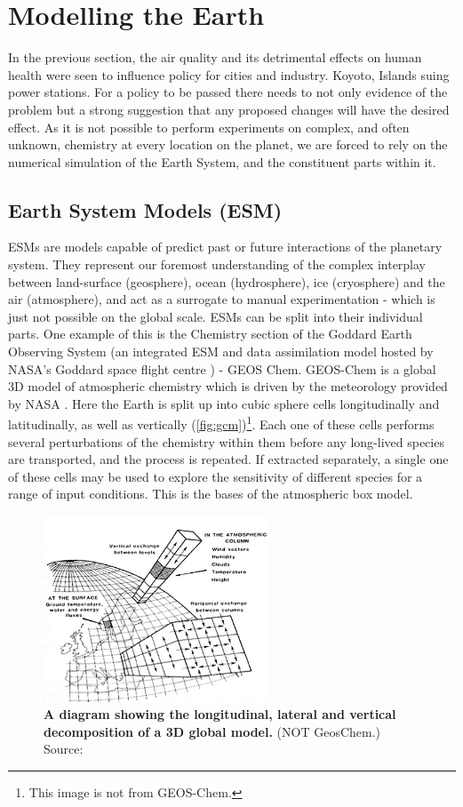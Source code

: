 
\section{Modelling the Earth}
In the previous section, the air quality and its detrimental effects on human health were seen to influence policy for cities and industry. Koyoto, Islands suing power stations.
For a policy to be passed there needs to not only evidence of the problem but a strong suggestion that any proposed changes will have the desired effect. As it is not possible to perform experiments on complex, and often unknown, chemistry at every location on the planet, we are forced to rely on the numerical simulation of the Earth System, and the constituent parts within it.
\subsection{Earth System Models (ESM)}
  ESMs are models capable of predict past or future interactions of the planetary system. They represent our foremost understanding of the complex interplay between land-surface (geosphere), ocean (hydrosphere), ice (cryosphere) and the air (atmosphere), and act as a surrogate to manual experimentation -  which is just not possible on the global scale.
ESMs can be split into their individual parts. One example of this is the Chemistry section of the Goddard Earth Observing System (an integrated ESM and data assimilation model hosted by NASA's Goddard space flight centre \citep{geosgit}) - GEOS Chem. GEOS-Chem is a global 3D model of atmospheric chemistry which is driven by the meteorology provided by NASA \citep{geos}. Here the Earth is split up into cubic sphere cells longitudinally and latitudinally, as well as vertically (\autoref{fig:gcm})\footnote{This image is not from GEOS-Chem.}. Each one of these cells performs several perturbations of the chemistry within them before any long-lived species are transported, and the process is repeated. If extracted separately, a single one of these cells may be used to explore the sensitivity of different species for a range of input conditions. This is the bases of the atmospheric box model.
\begin{figure}
  \centering
  \includegraphics[width=0.6\textwidth]{gcm.jpg}
  \caption{\textbf{A diagram showing the longitudinal, lateral and vertical decomposition of a 3D global model.} (NOT GeosChem.) Source: \citep{gcm}}
  \label{fig:gcm}
\end{figure}
